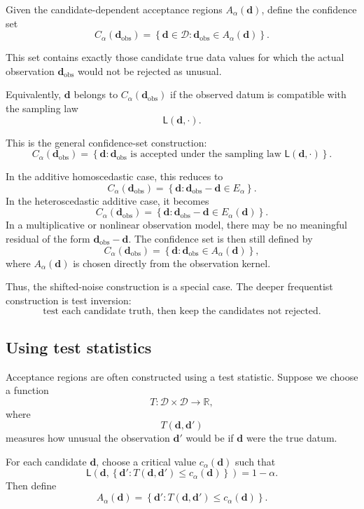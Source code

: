 \documentclass[11pt]{article}
\newcommand{\Dspace}{\mathcal D}
\newcommand{\dobs}{\mathbf d_{\mathrm{obs}}}
\newcommand{\Ealpha}{E_{\alpha}}
\newcommand{\Calpha}{C_{\alpha}}
\begin{document}
Given the candidate-dependent acceptance regions \(A_{\alpha}(\mathbf d)\), define the confidence set
\[
    \Calpha(\dobs)
    =
    \left\{
        \mathbf d\in\Dspace:
        \dobs\in A_{\alpha}(\mathbf d)
    \right\}.
\]

This set contains exactly those candidate true data values for which the actual observation \(\dobs\) would not be rejected as unusual.

Equivalently, \(\mathbf d\) belongs to \(\Calpha(\dobs)\) if the observed datum is compatible with the sampling law
\[
    \mathsf L(\mathbf d,\cdot).
\]

This is the general confidence-set construction:
\[
    \boxed{
    \Calpha(\dobs)
    =
    \left\{
        \mathbf d:
        \dobs
        \text{ is accepted under the sampling law }
        \mathsf L(\mathbf d,\cdot)
    \right\}.
    }
\]

In the additive homoscedastic case, this reduces to
\[
    \Calpha(\dobs)
    =
    \left\{
        \mathbf d:
        \dobs-\mathbf d\in\Ealpha
    \right\}.
\]
In the heteroscedastic additive case, it becomes
\[
    \Calpha(\dobs)
    =
    \left\{
        \mathbf d:
        \dobs-\mathbf d\in\Ealpha(\mathbf d)
    \right\}.
\]
In a multiplicative or nonlinear observation model, there may be no meaningful residual of the form \(\dobs-\mathbf d\). The confidence set is then still defined by
\[
    \Calpha(\dobs)
    =
    \left\{
        \mathbf d:
        \dobs\in A_{\alpha}(\mathbf d)
    \right\},
\]
where \(A_{\alpha}(\mathbf d)\) is chosen directly from the observation kernel.

Thus, the shifted-noise construction is a special case. The deeper frequentist construction is test inversion:
\[
    \text{test each candidate truth, then keep the candidates not rejected.}
\]

\subsection{Using test statistics}

Acceptance regions are often constructed using a test statistic. Suppose we choose a function
\[
    T:\Dspace\times\Dspace\to\mathbb R,
\]
where
\[
    T(\mathbf d,\mathbf d')
\]
measures how unusual the observation \(\mathbf d'\) would be if \(\mathbf d\) were the true datum.

For each candidate \(\mathbf d\), choose a critical value \(c_{\alpha}(\mathbf d)\) such that
\[
    \mathsf L
    \left(
        \mathbf d,
        \left\{
            \mathbf d':
            T(\mathbf d,\mathbf d')\leq c_{\alpha}(\mathbf d)
        \right\}
    \right)
    =
    1-\alpha.
\]
Then define
\[
    A_{\alpha}(\mathbf d)
    =
    \left\{
        \mathbf d':
        T(\mathbf d,\mathbf d')\leq c_{\alpha}(\mathbf d)
    \right\}.
\]
\end{document}
